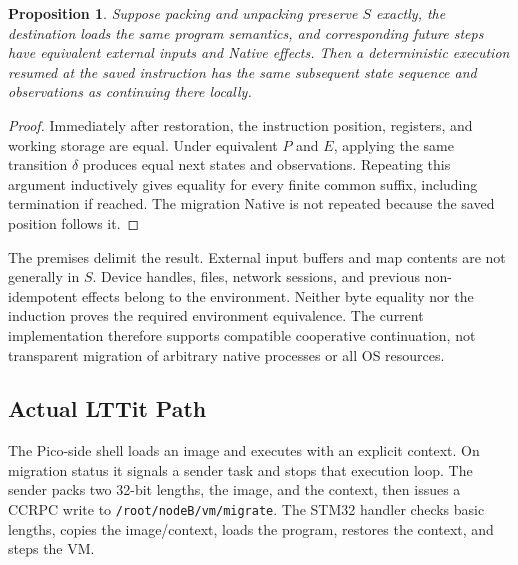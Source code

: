 \documentclass[conference,letterpaper]{IEEEtran}
\newtheorem{proposition}{Proposition}
\begin{document}
\begin{proposition}
Suppose packing and unpacking preserve $S$ exactly, the destination loads the same program semantics, and corresponding future steps have equivalent external inputs and Native effects. Then a deterministic execution resumed at the saved instruction has the same subsequent state sequence and observations as continuing there locally.
\end{proposition}
\begin{proof}
Immediately after restoration, the instruction position, registers, and working storage are equal. Under equivalent $P$ and $E$, applying the same transition $\delta$ produces equal next states and observations. Repeating this argument inductively gives equality for every finite common suffix, including termination if reached. The migration Native is not repeated because the saved position follows it.
\end{proof}

The premises delimit the result. External input buffers and map contents are not generally in $S$. Device handles, files, network sessions, and previous non-idempotent effects belong to the environment. Neither byte equality nor the induction proves the required environment equivalence. The current implementation therefore supports compatible cooperative continuation, not transparent migration of arbitrary native processes or all OS resources.

\subsection{Actual LTTit Path}
The Pico-side shell loads an image and executes with an explicit context. On migration status it signals a sender task and stops that execution loop. The sender packs two 32-bit lengths, the image, and the context, then issues a CCRPC write to \texttt{/root/nodeB/vm/migrate}. The STM32 handler checks basic lengths, copies the image/context, loads the program, restores the context, and steps the VM.
\end{document}
